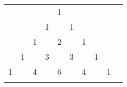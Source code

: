 \documentclass[preview]{standalone}
\begin{document}
\begin{center}
    \begin{tabular}{rccccccccc}
        &    &    &    &  1 \\\noalign{\smallskip\smallskip}
        &    &    &  1 &    &  1 \\\noalign{\smallskip\smallskip}
        &    &  1 &    &  2 &    &  1 \\\noalign{\smallskip\smallskip}
        &  1 &    &  3 &    &  3 &    &  1 \\\noalign{\smallskip\smallskip}
      1 &    &  4 &    &  6 &    &  4 &    &  1 \\\noalign{\smallskip\smallskip}
    \end{tabular}
    \end{center}
\end{document}
